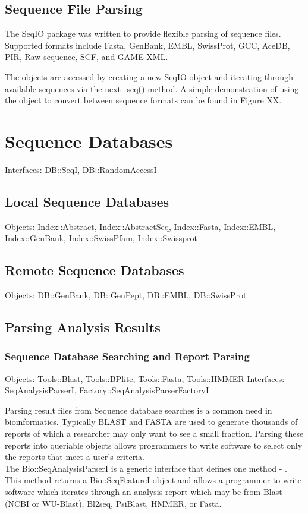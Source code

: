 \documentclass{article}
\begin{document}
\begin{twocolumn}
\subsection{Sequence File Parsing}

The SeqIO package was written to provide flexible parsing of sequence
files.  Supported formats include Fasta, GenBank, EMBL, SwissProt,
GCC, AceDB, PIR, Raw sequence, SCF, and GAME XML. 

The objects are accessed by creating a new SeqIO object and iterating
through available sequences via the next\_seq() method.  A simple
demonstration of using the object to convert between sequence formats
can be found in Figure XX.



\section{Sequence Databases}

Interfaces: DB::SeqI, DB::RandomAccessI

\subsection{Local Sequence Databases}
Objects: Index::Abstract, Index::AbstractSeq, Index::Fasta,
Index::EMBL, Index::GenBank, Index::SwissPfam, Index::Swissprot

\subsection{Remote Sequence Databases}

Objects: DB::GenBank, DB::GenPept, DB::EMBL, DB::SwissProt

\subsection{Parsing Analysis Results}

\subsubsection{Sequence Database Searching and Report Parsing}

Objects: Tools::Blast, Tools::BPlite, Tools::Fasta,
Tools::HMMER
Interfaces: SeqAnalysisParserI, Factory::SeqAnalysisParserFactoryI

Parsing result files from Sequence database searches is a common need
in bioinformatics.  Typically BLAST and FASTA are used to generate
thousands of reports of which a researcher may only want to see a
small fraction.  Parsing these reports into queriable objects allows
programmers to write software to select only the reports that meet a
user's criteria.
\\
The Bio::SeqAnalysisParserI is a generic interface that defines one
method - .  This method returns a Bio::SeqFeatureI object
and allows a programmer to write software which iterates through an
analysis report which may be from Blast (NCBI or WU-Blast), Bl2seq,
PsiBlast, HMMER, or Fasta. 


\end{twocolumn}
\end{document}
